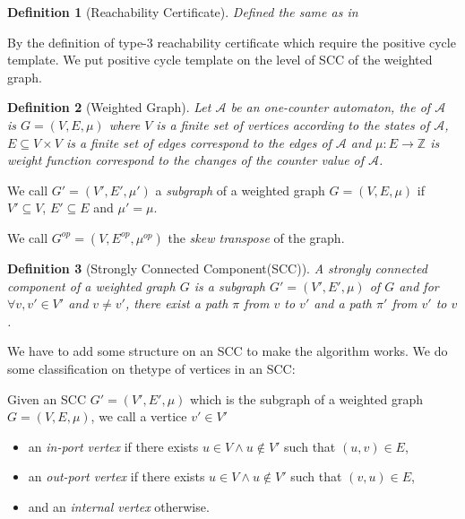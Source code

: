 \documentclass[12pt]{article}
\newtheorem{definition}{Definition}
\begin{document}
\begin{definition}[Reachability Certificate]
Defined the same as in \cite{DBLP:conf/icalp/ChistikovH17}
\end{definition}

By the definition of type-3 reachability certificate which require the positive cycle template. We put positive cycle template on the level of SCC of the weighted graph.


\begin{definition}[Weighted Graph]
Let $\mathcal{A}$ be an one-counter automaton, the  of $\mathcal{A}$ is $G = (V,E,\mu)$ where $V$ is a finite set of vertices according to the states of $\mathcal{A}$, $E\subseteq V\times V$ is a finite set of edges correspond to the edges of $\mathcal{A}$ and $\mu : E\rightarrow \mathbb{Z}$ is weight function correspond to the changes of the counter value of $\mathcal{A}$.
\end{definition}

We call $G' = (V', E', \mu')$ a \textit{subgraph} of a weighted graph $G = (V, E, \mu)$ if $V'\subseteq V$, $E'\subseteq E$ and $\mu' = \mu$.

We call $G^{op} = (V, E^{op}, \mu^{op})$ the \textit{skew transpose} of the graph.

\begin{definition}[Strongly Connected Component(SCC)]
A strongly connected component of a weighted graph $G$ is a subgraph $G' = (V', E', \mu)$ of $G$ and for $\forall v, v'\in V'$ and $v \ne v'$, there exist a path $\pi$ from $v$ to $v'$ and a path $\pi'$ from $v'$ to $v$.


\end{definition}

We have to add some  structure on an SCC to make the algorithm works. We do some classification on thetype of vertices in an SCC:

Given an SCC $G' = (V', E', \mu)$ which is the subgraph of a weighted graph $G = (V, E, \mu)$, we call a vertice $v'\in V'$ 

\begin{itemize}
\item an \textit{in-port vertex} if there exists $u \in V \wedge u \notin V'$ such that $(u,v) \in E$,
\item an \textit{out-port vertex} if there exists $u \in V \wedge u \notin V'$ such that $(v,u) \in E$,
\item and an \textit{internal vertex} otherwise.
\end{itemize}
\end{document}
